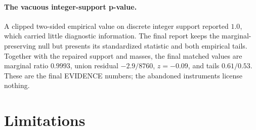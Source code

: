 \documentclass[11pt]{amsart}%
\begin{document}
\paragraph{The vacuous integer-support p-value.}
A clipped two-sided empirical value on discrete integer support reported
\(1.0\), which carried little diagnostic information.  The final report keeps
the marginal-preserving null but presents its standardized statistic and both
empirical tails.  Together with the repaired support and masses, the final
matched values are marginal ratio \(0.9993\), union residual \(-2.9/8760\),
\(z=-0.09\), and tails \(0.61/0.53\).  These are the final EVIDENCE numbers;
the abandoned instruments license nothing.

\section{Limitations}
\end{document}
